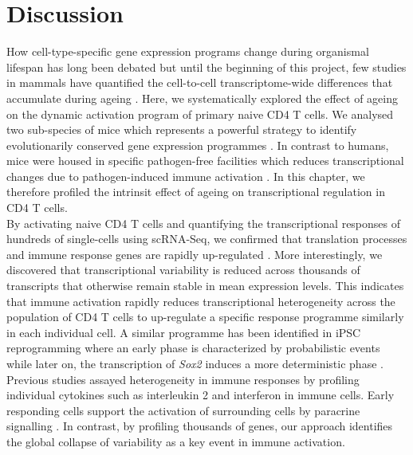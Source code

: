 
\section{Discussion}

How cell-type-specific gene expression programs change during organismal lifespan has long been debated \citep{Bahar2006, Warren2007} but until the beginning of this project, few studies in mammals have quantified the cell-to-cell transcriptome-wide differences that accumulate during ageing \citep{Kowalczyk2015}. Here, we systematically explored the effect of ageing on the dynamic activation program of primary naive CD4\plus{} T cells. We analysed two sub-species of mice which represents a powerful strategy to identify evolutionarily conserved gene expression programmes \citep{Shay2013}. In contrast to humans, mice were housed in specific pathogen-free facilities which reduces transcriptional changes due to pathogen-induced immune activation \citep{Beura2016}. In this chapter, we therefore profiled the intrinsit effect of ageing on transcriptional regulation in CD4\plus{} T cells.\\

By activating naive CD4\plus{} T cells and quantifying the transcriptional responses of hundreds of single-cells using scRNA-Seq, we confirmed that translation processes and immune response genes are rapidly up-regulated \citep{Asmal2003, Neme2016, Turner2014, Glass2010, Gerondakis2010, Croft2009}. More interestingly, we discovered that transcriptional variability is reduced across thousands of transcripts that otherwise remain stable in mean expression levels. This indicates that immune activation rapidly reduces transcriptional heterogeneity across the population of CD4\plus{} T cells to up-regulate a specific response programme similarly in each individual cell. A similar programme has been identified in iPSC reprogramming where an early phase is characterized by probabilistic events while later on, the transcription of \textit{Sox2} induces a  more deterministic phase \citep{Buganim2012}. Previous studies assayed heterogeneity in immune responses by profiling individual cytokines such as interleukin 2 and interferon \textbeta{} in immune cells. Early responding cells support the activation of surrounding cells by paracrine signalling \citep{Fuhrmann2016, Shalek2014}. In contrast, by profiling thousands of genes, our approach identifies the global collapse of variability as a key event in immune activation.\\

